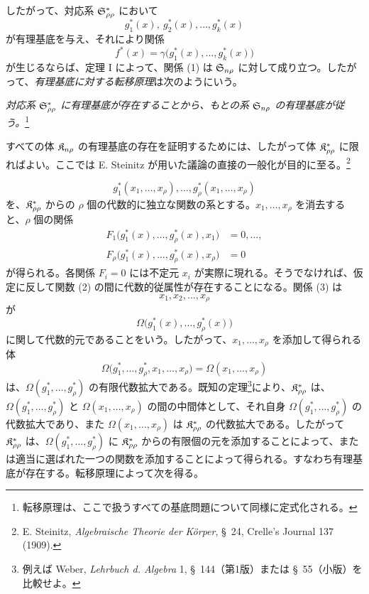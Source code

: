 \documentclass[11pt]{jlreq}
\begin{document}
したがって、対応系 $\mathfrak{S}^*_{\rho\rho}$ において
\[
  g_1^*(x),\ g_2^*(x),\ldots,g_k^*(x)
\]
が有理基底を与え、それにより関係
\[
  f^*(x)=\gamma\bigl(g_1^*(x),\ldots,g_k^*(x)\bigr)
\]
が生じるならば、定理 I によって、関係 (1) は $\mathfrak{S}_{n\rho}$ に対して成り立つ。したがって、\emph{有理基底に対する転移原理}は次のようにいう。

\emph{対応系 $\mathfrak{S}^*_{\rho\rho}$ に有理基底が存在することから、もとの系 $\mathfrak{S}_{n\rho}$ の有理基底が従う。}\footnote{転移原理は、ここで扱うすべての基底問題について同様に定式化される。}

すべての体 $\mathfrak{K}_{n\rho}$ の有理基底の存在を証明するためには、したがって体 $\mathfrak{K}^*_{\rho\rho}$ に限ればよい。ここでは E. Steinitz が用いた議論の直接の一般化が目的に至る。\footnote{E. Steinitz, \emph{Algebraische Theorie der Körper}, \S\ 24, Crelle's Journal 137 (1909).}

\begin{equation}
  g_1^*(x_1,\ldots,x_\rho),\ldots,
  g_\rho^*(x_1,\ldots,x_\rho)
\tag{2}
\end{equation}
を、$\mathfrak{K}^*_{\rho\rho}$ からの $\rho$ 個の代数的に独立な関数の系とする。$x_1,\ldots,x_\rho$ を消去すると、$\rho$ 個の関係
\begin{equation}
\begin{aligned}
  F_1\bigl(g_1^*(x),\ldots,g_\rho^*(x),x_1\bigr)&=0,\ldots,\\
  F_\rho\bigl(g_1^*(x),\ldots,g_\rho^*(x),x_\rho\bigr)&=0
\end{aligned}
\tag{3}
\end{equation}
が得られる。各関係 $F_i=0$ には不定元 $x_i$ が実際に現れる。そうでなければ、仮定に反して関数 (2) の間に代数的従属性が存在することになる。関係 (3) は
\[
  x_1,x_2,\ldots,x_\rho
\]
が
\[
  \Omega\bigl(g_1^*(x),\ldots,g_\rho^*(x)\bigr)
\]
に関して代数的元であることをいう。したがって、$x_1,\ldots,x_\rho$ を添加して得られる体
\[
  \Omega\bigl(g_1^*,\ldots,g_\rho^*,x_1,
  \ldots,x_\rho\bigr)=\Omega(x_1,
  \ldots,x_\rho)
\]
は、$\Omega(g_1^*,\ldots,g_\rho^*)$ の有限代数拡大である。既知の定理\footnote{例えば Weber, \emph{Lehrbuch d. Algebra} 1, \S\ 144（第1版）または \S\ 55（小版）を比較せよ。}により、$\mathfrak{K}^*_{\rho\rho}$ は、$\Omega(g_1^*,\ldots,g_\rho^*)$ と $\Omega(x_1,\ldots,x_\rho)$ の間の中間体として、それ自身 $\Omega(g_1^*,\ldots,g_\rho^*)$ の代数拡大であり、また $\Omega(x_1,\ldots,x_\rho)$ は $\mathfrak{K}^*_{\rho\rho}$ の代数拡大である。したがって $\mathfrak{K}^*_{\rho\rho}$ は、$\Omega(g_1^*,\ldots,g_\rho^*)$ に $\mathfrak{K}^*_{\rho\rho}$ からの有限個の元を添加することによって、または適当に選ばれた一つの関数を添加することによって得られる。すなわち有理基底が存在する。転移原理によって次を得る。
\end{document}
